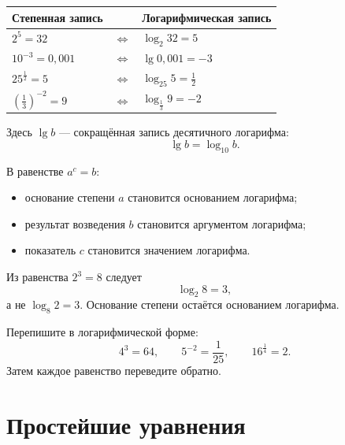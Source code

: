 \begin{center}
  \renewcommand{\arraystretch}{1.38}
  \begin{tabularx}{\textwidth}{
    >{\centering\arraybackslash}p{}
    >{\centering\arraybackslash}p{}
    >{\centering\arraybackslash}X}
    \toprule
    \rowcolor{TableHeader}
    Степенная запись & & Логарифмическая запись \\
    \midrule
    \(2^5=32\) & \(\Longleftrightarrow\) & \(\log_2 32=5\) \\
    \(10^{-3}=0{,}001\) & \(\Longleftrightarrow\) & \(\lg 0{,}001=-3\) \\
    \(25^{\frac12}=5\) & \(\Longleftrightarrow\) & \(\log_{25}5=\frac12\) \\
    \(\left(\frac13\right)^{-2}=9\) & \(\Longleftrightarrow\) &
      \(\log_{\frac13}9=-2\) \\
    \bottomrule
  \end{tabularx}
\end{center}

Здесь \(\lg b\) --- сокращённая запись десятичного логарифма:
\[
  \lg b=\log_{10}b.
\]

\begin{methodintro}
  В равенстве \(a^c=b\):
  \begin{itemize}
    \item основание степени \(a\) становится основанием логарифма;
    \item результат возведения \(b\) становится аргументом логарифма;
    \item показатель \(c\) становится значением логарифма.
  \end{itemize}
\end{methodintro}

\begin{warningbox}
  Из равенства \(2^3=8\) следует
  \[
    \log_2 8=3,
  \]
  а не \(\log_8 2=3\). Основание степени остаётся основанием логарифма.
\end{warningbox}

\begin{trainingtask}
  Перепишите в логарифмической форме:
  \[
    4^3=64,
    \qquad
    5^{-2}=\frac1{25},
    \qquad
    16^{\frac14}=2.
  \]
  Затем каждое равенство переведите обратно.
\end{trainingtask}

\section{Простейшие уравнения}

